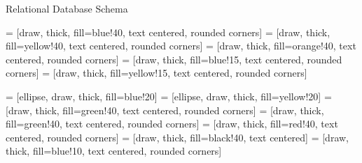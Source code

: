 \begin{frame}[t]{Relational Database Schema}

  \hspace*{-.5in}
  \begin{minipage}{5in}
  \begin{center}

    \begin{minipage}{4.5in}

     = [draw, thick, fill=blue!40, text centered, rounded corners]
     = [draw, thick, fill=yellow!40, text centered, rounded corners]
     = [draw, thick, fill=orange!40, text centered, rounded corners]
     = [draw, thick, fill=blue!15, text centered, rounded corners]
     = [draw, thick, fill=yellow!15, text centered, rounded corners]

     = [ellipse, draw, thick, fill=blue!20]
     = [ellipse, draw, thick, fill=yellow!20]
     = [draw, thick, fill=green!40, text centered, rounded corners]  
     = [draw, thick, fill=green!40, text centered, rounded corners]  
     = [draw, thick, fill=red!40, text centered, rounded corners]  
     = [draw, thick, fill=black!40, text centered]
     = [draw, thick, fill=blue!10, text centered, rounded corners]


    

    




    \begin{figure}

    \begin{center}

      \begin{tikzpicture}[node distance=1cm, auto,>=stealth, thick]
	

\end{tikzpicture}
\end{center}
\end{figure}
\end{minipage}
\end{center}
\end{minipage}
\end{frame}
